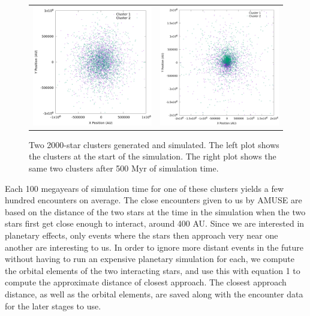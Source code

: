 \documentclass[12pt]{article}
\begin{document}
    \begin{figure}[H]
        \centering
        \caption{Two 2000-star clusters generated and simulated. The left plot
            shows the clusters at the start of the simulation. The right plot shows
            the same two clusters after 500 Myr of simulation time.}
        \begin{tabular}{cc}
            \includegraphics[width=3.0in]{clusters_superimposed_n_2000} &
            \includegraphics[width=3.0in]{clusters_superimposed_final_n_2000}
        \end{tabular}
    \end{figure}

    Each 100 megayears of simulation time for one of these clusters yields a
    few hundred encounters on average. The close encounters given to us by 
    AMUSE are based on the distance of the two stars at the time in the simulation
    when the two stars first get close enough to interact, around 400 AU.
    Since we are interested in planetary effects, only events where the stars
    then approach very near one another are interesting to us. In order to
    ignore more distant events in the future without having to run an expensive 
    planetary simulation for each, we compute the orbital elements of the two
    interacting stars, and use this with equation 1 to compute the approximate
    distance of closest approach. The closest approach distance, as well as 
    the orbital elements, are saved along with the encounter data for the later
    stages to use.
\end{document}
